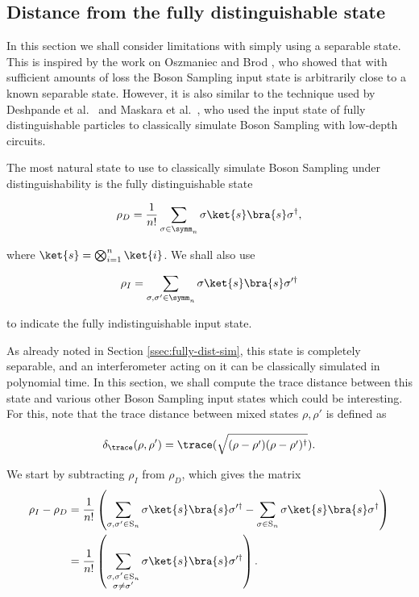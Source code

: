 \subsection{Distance from the fully distinguishable state}
\label{ssec:fixed-dist-distance}

In this section we shall consider limitations with simply using a separable state. This is inspired by the work on Oszmaniec and Brod \cite{oszmaniec2018}, who showed that with sufficient amounts of loss the Boson Sampling input state is arbitrarily close to a known separable state. However, it is also similar to the technique used by Deshpande et al.~\cite{deshpande2018} and Maskara et al.~\cite{maskara2019}, who used the input state of fully distinguishable particles to classically simulate Boson Sampling with low-depth circuits.

The most natural state to use to classically simulate Boson Sampling under distinguishability is the fully distinguishable state

\begin{equation}
\rho_D = \frac{1}{n!}\sum_{\sigma\in\symm_n}\sigma\ket{s}\bra{s}\sigma^\dagger,
\end{equation}

\noindent where $\ket{s} = \bigotimes_{i=1}^n\ket{i}$. We shall also use 

\begin{equation}
\rho_I = \sum_{\sigma, \sigma' \in \symm_n}\sigma\ket{s}\bra{s}\sigma'^\dagger
\end{equation}

\noindent to indicate the fully indistinguishable input state.

As already noted in Section \ref{ssec:fully-dist-sim}, this state is completely separable, and an interferometer acting on it can be classically simulated in polynomial time. In this section, we shall compute the trace distance between this state and various other Boson Sampling input states which could be interesting. For this, note that the trace distance between mixed states $\rho, \rho'$ is defined as

\begin{equation}
\delta_{\trace}
(\rho, \rho') = \trace(\sqrt{(\rho - \rho')(\rho-\rho')^\dagger}).
\end{equation}

We start by subtracting $\rho_I$ from $\rho_D$, which gives the matrix\begin{align}
\rho_I - \rho_D &= \frac{1}{n!}\left(\sum_{\sigma,\sigma'\in\textrm{S}_n}\sigma\ket{s}\bra{s}\sigma'^\dagger - \sum_{\sigma \in \textrm{S}_n}\sigma\ket{s}\bra{s}\sigma^\dagger\right)\\
&= \frac{1}{n!}\left(\sum_{\substack{\sigma,\sigma'\in\textrm{S}_n\\\sigma\neq\sigma'}}\sigma\ket{s}\bra{s}\sigma'^\dagger\right).
\end{align}

